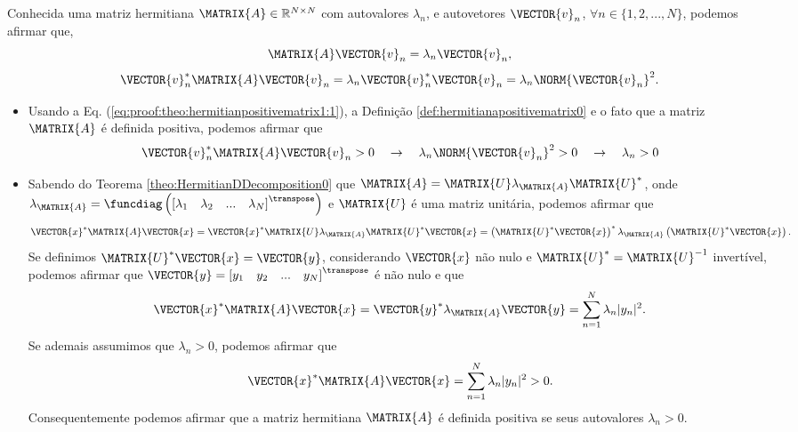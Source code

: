 \begin{myproofT}\label{proof:theo:hermitianpositivematrix1}
Conhecida uma matriz hermitiana $\MATRIX{A} \in \mathbb{R}^{N \times N}$ com  autovalores $\lambda_n$,
e autovetores $\VECTOR{v}_n$, $\forall n \in \{1, 2, ..., N\}$, podemos afirmar que,
\begin{equation}\label{eq:proof:theo:hermitianpositivematrix1:0}
\MATRIX{A}\VECTOR{v}_n=\lambda_n \VECTOR{v}_n,
\end{equation}
\begin{equation}\label{eq:proof:theo:hermitianpositivematrix1:1}
\VECTOR{v}_n^{\ast}\MATRIX{A}\VECTOR{v}_n=
\lambda_n \VECTOR{v}_n^{\ast}\VECTOR{v}_n=
\lambda_n \NORM{\VECTOR{v}_n}^2.
\end{equation}

\begin{itemize}
\item Usando a Eq. (\ref{eq:proof:theo:hermitianpositivematrix1:1}), a 
Definição \ref{def:hermitianapositivematrix0} e o fato que a matriz $\MATRIX{A}$ é definida positiva,
podemos afirmar que
\begin{equation}
\VECTOR{v}_n^{\ast}\MATRIX{A}\VECTOR{v}_n >0
\quad \rightarrow \quad
\lambda_n \NORM{\VECTOR{v}_n}^2 > 0
\quad \rightarrow \quad
\lambda_n  > 0
\end{equation} 
\item Sabendo do Teorema \ref{theo:HermitianDDecomposition0} que 
$\MATRIX{A}=\MATRIX{U}\lambda_{\MATRIX{A}} \MATRIX{U}^{\ast}$,
onde 
$\lambda_{\MATRIX{A}}=\funcdiag\left(\left[\lambda_1\quad \lambda_2 \quad ... \quad \lambda_N \right]^{\transpose}\right)$
e $\MATRIX{U}$ é uma matriz unitária,
podemos afirmar que
\begin{equation}
\VECTOR{x}^{\ast}\MATRIX{A}\VECTOR{x}=
\VECTOR{x}^{\ast}\MATRIX{U}\lambda_{\MATRIX{A}} \MATRIX{U}^{\ast}\VECTOR{x}=
\left(\MATRIX{U}^{\ast}\VECTOR{x}\right)^{\ast}\lambda_{\MATRIX{A}}\left(\MATRIX{U}^{\ast}\VECTOR{x}\right).
\end{equation}
Se definimos $\MATRIX{U}^{\ast}\VECTOR{x}=\VECTOR{y}$, considerando
$\VECTOR{x}$ não nulo e $\MATRIX{U}^{\ast}=\MATRIX{U}^{-1}$ invertível,
podemos afirmar que 
$\VECTOR{y}=\left[y_1\quad y_2 \quad ... \quad y_N \right]^{\transpose}$ é não nulo e que 
\begin{equation}
\VECTOR{x}^{\ast}\MATRIX{A}\VECTOR{x}=
\VECTOR{y}^{\ast}\lambda_{\MATRIX{A}}\VECTOR{y}=\sum_{n=1}^{N}\lambda_n |y_n|^2.
\end{equation}
Se ademais assumimos que $\lambda_n  > 0$, podemos afirmar que 
\begin{equation}
\VECTOR{x}^{\ast}\MATRIX{A}\VECTOR{x}=\sum_{n=1}^{N}\lambda_n |y_n|^2>0.
\end{equation}
Consequentemente podemos afirmar que a matriz hermitiana $\MATRIX{A}$
é definida positiva se seus autovalores $\lambda_n  > 0$.
\end{itemize}
\end{myproofT}

